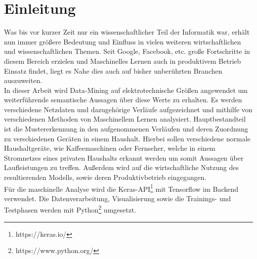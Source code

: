 \chapter{Einleitung}

    Was bis vor kurzer Zeit nur ein wissenschaftlicher Teil der Informatik war, erhält nun immer größere Bedeutung und Einfluss in vielen weiteren wirtschaftlichen und wissenschaftlichen Themen. 
    Seit Google, Facebook, etc. große Fortschritte in diesem Bereich erzielen und Maschinelles Lernen auch in produktivem Betrieb Einsatz findet, liegt es Nahe dies auch auf bisher unberührten Branchen auszuweiten.\\
    \newline
    In dieser Arbeit wird Data-Mining auf elektrotechnische Größen angewendet um weiterführende semantische Aussagen über diese Werte zu erhalten. 
    Es werden verschiedene Netzdaten und dazugehörige Verläufe aufgezeichnet und mithilfe von verschiedenen Methoden von Maschinellem Lernen analysiert.
    Hauptbestandteil ist die Mustererkennung in den aufgenommenen Verläufen und deren Zuordnung zu verschiedenen Geräten in einem Haushalt. 
    Hierbei sollen verschiedene normale Haushaltgeräte, wie Kaffeemaschinen oder Fernseher, welche in einem Stromnetzes eines privaten Haushalts erkannt werden um somit Aussagen über Laufleistungen zu treffen.
    Außerdem wird auf die wirtschaftliche Nutzung des resultierenden Modells, sowie deren Produktivbetrieb eingegangen.\\
    \newline
    Für die maschinelle Analyse wird die Keras-API\footnote{https://keras.io/} mit Tensorflow im Backend verwendet.
    Die Datenverarbeitung, Visualisierung sowie die Trainings- und Testphasen werden mit Python\footnote{https://www.python.org/} umgesetzt.
